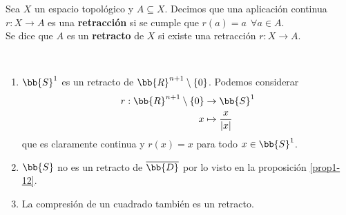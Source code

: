 \begin{definicion}
    Sea $X$ un espacio topológico y $A\subseteq X$. Decimos que una aplicación continua $r:X \to A$ es una \textbf{retracción} si se cumple que $r(a) = a\ \ \forall a \in A$.\\

    Se dice que $A$ es un \textbf{retracto} de $X$ si existe una retracción $r:X \to A$.
\end{definicion}

\begin{ejemplo}\
    \begin{enumerate}
        \item $\bb{S}^1$ es un retracto de $\bb{R}^{n+1}\setminus \{0\}$. Podemos considerar
        \begin{align*}
            r:\bb{R}^{n+1}\setminus \{0\} &\to \bb{S}^1\\
            x & \mapsto \frac{x}{|x|}
        \end{align*}
        que es claramente continua y $r(x) = x$ para todo $x\in \bb{S}^1$.

        \item $\bb{S}$ no es un retracto de $\overline{\bb{D}}$ por lo visto en la proposición \ref{prop1-12}.
        
        \item La compresión de un cuadrado también es un retracto. 
        \begin{figure}[H]
            \centering
        \end{figure}
    \end{enumerate}
\end{ejemplo}


